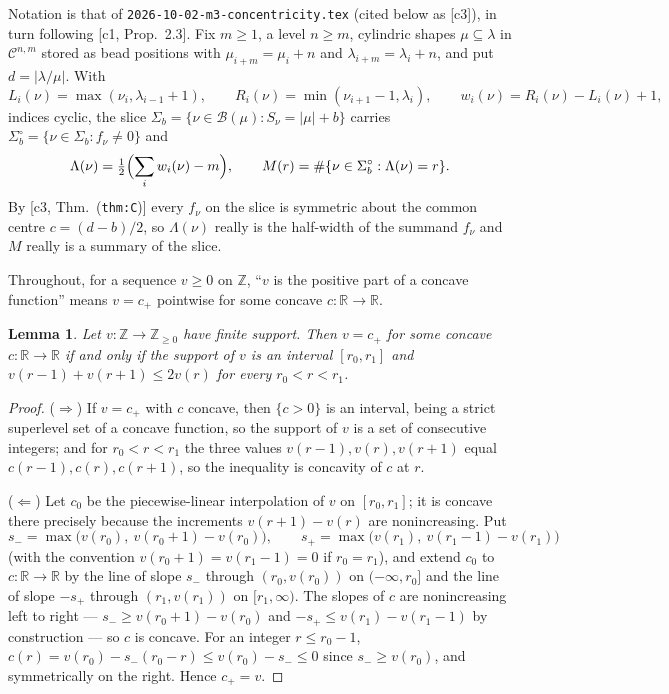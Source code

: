 \documentclass[11pt]{article}
\newtheorem{lemma}[theorem]{Lemma}
\theoremstyle{definition}
\newcommand{\Z}{\mathbb Z}
\newcommand{\R}{\mathbb R}
\newcommand{\Bx}{\mathcal B}
\newcommand{\abs}[1]{\lvert #1\rvert}
\begin{document}
Notation is that of \texttt{2026-10-02-m3-concentricity.tex} (cited below as [c3]), in
turn following [c1, Prop.~2.3]. Fix $m\ge1$, a level $n\ge m$, cylindric shapes
$\mu\subseteq\lambda$ in $\mathcal C^{n,m}$ stored as bead positions with
$\mu_{i+m}=\mu_i+n$ and $\lambda_{i+m}=\lambda_i+n$, and put $d=\abs{\lambda/\mu}$. With
\[
  L_i(\nu)=\max(\nu_i,\lambda_{i-1}+1),\qquad
  R_i(\nu)=\min(\nu_{i+1}-1,\lambda_i),\qquad
  w_i(\nu)=R_i(\nu)-L_i(\nu)+1,
\]
indices cyclic, the slice $\Sigma_b=\{\nu\in\Bx(\mu):S_\nu=\abs\mu+b\}$ carries
$\Sigma^\circ_b=\{\nu\in\Sigma_b:f_\nu\ne0\}$ and
\[
  \Lambda(\nu)=\tfrac12\Bigl(\sum_i w_i(\nu)-m\Bigr),\qquad
  M(r)=\#\{\nu\in\Sigma_b^\circ:\Lambda(\nu)=r\}.
\]
By [c3, Thm.~(\texttt{thm:C})] every $f_\nu$ on the slice is symmetric about the common
centre $c=(d-b)/2$, so $\Lambda(\nu)$ really is the half-width of the summand $f_\nu$ and
$M$ really is a summary of the slice.

Throughout, for a sequence $v\ge0$ on $\Z$, ``$v$ is the positive part of a concave
function'' means $v=c_+$ pointwise for some concave $c:\R\to\R$.

\begin{lemma}\label{lem:cpos}
Let $v:\Z\to\Z_{\ge0}$ have finite support. Then $v=c_+$ for some concave $c:\R\to\R$ if
and only if the support of $v$ is an interval $[r_0,r_1]$ and
$v(r-1)+v(r+1)\le2v(r)$ for every $r_0<r<r_1$.
\end{lemma}

\begin{proof}
($\Rightarrow$) If $v=c_+$ with $c$ concave, then $\{c>0\}$ is an interval, being a
strict superlevel set of a concave function, so the support of $v$ is a set of
consecutive integers; and for $r_0<r<r_1$ the three values $v(r-1),v(r),v(r+1)$ equal
$c(r-1),c(r),c(r+1)$, so the inequality is concavity of $c$ at $r$.

($\Leftarrow$) Let $c_0$ be the piecewise-linear interpolation of $v$ on $[r_0,r_1]$; it
is concave there precisely because the increments $v(r+1)-v(r)$ are nonincreasing. Put
\[
  s_-=\max\bigl(v(r_0),\ v(r_0+1)-v(r_0)\bigr),\qquad
  s_+=\max\bigl(v(r_1),\ v(r_1-1)-v(r_1)\bigr)
\]
(with the convention $v(r_0+1)=v(r_1-1)=0$ if $r_0=r_1$), and extend $c_0$ to
$c:\R\to\R$ by the line of slope $s_-$ through $(r_0,v(r_0))$ on $(-\infty,r_0]$ and the
line of slope $-s_+$ through $(r_1,v(r_1))$ on $[r_1,\infty)$. The slopes of $c$ are
nonincreasing left to right --- $s_-\ge v(r_0+1)-v(r_0)$ and
$-s_+\le v(r_1)-v(r_1-1)$ by construction --- so $c$ is concave. For an integer
$r\le r_0-1$, $c(r)=v(r_0)-s_-(r_0-r)\le v(r_0)-s_-\le0$ since $s_-\ge v(r_0)$, and
symmetrically on the right. Hence $c_+=v$.
\end{proof}
\end{document}
